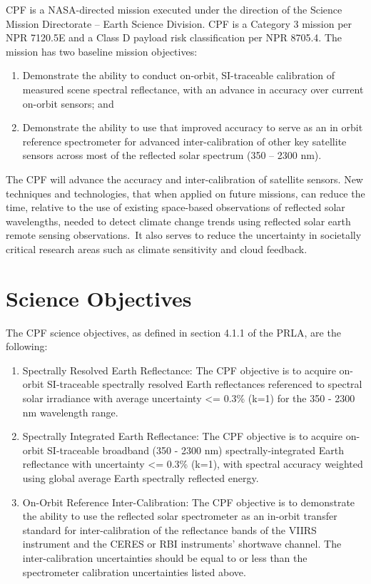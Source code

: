 \documentclass[12pt,oneside,oldfontcommands]{memoir}
\begin{document}
\gls{CPF} is a NASA-directed mission executed under the direction of the Science Mission Directorate – Earth Science Division. \gls{CPF} is a Category 3 mission per NPR 7120.5E and a Class D payload risk classification per NPR 8705.4. The mission has two baseline mission objectives:

\begin{enumerate}
\item{} Demonstrate the ability to conduct on-orbit, \gls{SI}-traceable calibration of \gls{measure}d scene spectral reflectance, with an advance in accuracy over current on-orbit sensors; and

\item{} Demonstrate the ability to use that improved accuracy to serve as an in orbit reference spectrometer for advanced inter-calibration of other key satellite sensors across most of the reflected solar spectrum (350 – 2300 nm).

\end{enumerate}

The \gls{CPF} will advance the accuracy and inter-calibration of satellite sensors. New techniques and technologies, that when applied on future missions, can reduce the time, relative to the use of existing space-based observations of reflected solar wavelengths, needed to detect climate change trends using reflected solar earth remote sensing observations. It also serves to reduce the uncertainty in societally critical research areas such as climate sensitivity and cloud feedback.

\section{Science Objectives }
\label{scienceobjectives}

The \gls{CPF} science objectives, as defined in section 4.1.1 of the PRLA, are the following:

\begin{enumerate}
\item{} Spectrally Resolved Earth Reflectance: The \gls{CPF} objective is to acquire on-orbit \gls{SI}-traceable spectrally resolved Earth reflectances referenced to spectral solar irradiance with average uncertainty <= 0.3\% (k=1) for the 350 - 2300 nm wavelength range.

\item{} Spectrally Integrated Earth Reflectance: The \gls{CPF} objective is to acquire on-orbit \gls{SI}-traceable broadband (350 - 2300 nm) spectrally-integrated Earth reflectance with uncertainty <= 0.3\% (k=1), with spectral accuracy weighted using global average Earth spectrally reflected energy.

\item{} On-Orbit Reference Inter-Calibration: The \gls{CPF} objective is to demonstrate the ability to use the reflected solar spectrometer as an in-orbit transfer standard for inter-calibration of the reflectance bands of the \gls{VIIRS} instrument and the \gls{CERES} or \gls{RBI} instruments' shortwave channel. The inter-calibration uncertainties should be equal to or less than the spectrometer calibration uncertainties listed above.

\end{enumerate}
\end{document}
